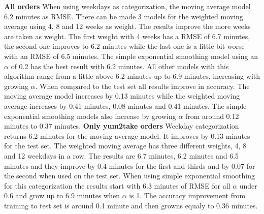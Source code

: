 \newline\newline\textbf{All orders}\newline
When using weekdays as categorization, the moving average model 6.2 minutes as RMSE. There can be made 3 models for the weighted moving average using 4, 8 and 12 weeks as weight. The results improve the more weeks are taken as weight. The first weight with 4 weeks has a RMSE of 6.7 minutes, the second one improves to 6.2 minutes while the last one is a little bit worse with an RMSE of 6.5 minutes. The simple exponential smoothing model using an $\alpha$ of 0.2 has the best result with 6.2 minutes. All other models with this algorithm range from a little above 6.2 minutes up to 6.9 minutes, increasing with growing $\alpha$. When compared to the test set all results improve in accuracy. The moving average model increases by 0.13 minutes while the weighted moving average increases by 0.41 minutes, 0.08 minutes and 0.41 minutes. The simple exponential smoothing models also increase by growing $\alpha$ from around 0.12 minutes to 0.37 minutes.
\newline\newline\textbf{Only yum2take orders}\newline
Weekday categorization returns 6.2 minutes for the moving average model. It improves by 0.13 minutes for the test set. The weighted moving average has three different weights, 4, 8 and 12 weekdays in a row. The results are 6.7 minutes, 6.2 minutes and 6.5 minutes and they improve by 0.4 minutes for the first and thirds and by 0.07 for the second when used on the test set. When using simple exponential smoothing for this categorization the results start with 6.3 minutes of RMSE for all $\alpha$ under 0.6 and grow up to 6.9 minutes when $\alpha$ is 1. The accuracy improvement from training to test set is around 0.1 minute and then growns equaly to 0.36 minutes.

